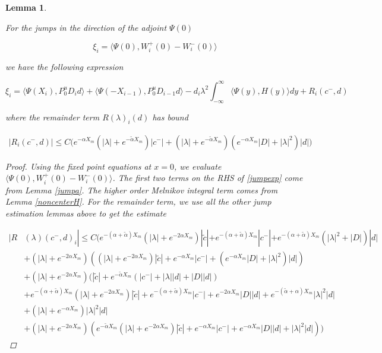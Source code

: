 \documentclass[12pt]{article}
\newtheorem{lemma}{Lemma}
\begin{document}
\begin{lemma}\label{jump}

For the jumps in the direction of the adjoint $\Psi(0)$

\[
\xi_i = \langle \Psi(0), W_i^+(0) - W_i^-(0) \rangle
\]

we have the following expression

\begin{equation}\label{jumpexp}
\xi_i = \langle \Psi(X_i), P^u_0 D_i d \rangle + \langle \Psi(-X_{i-1}), P^u_0 D_{i-1} d \rangle - d_i \lambda^2 \int_{-\infty}^\infty \langle \Psi(y), H(y) \rangle dy + R_i(c^-, d)
\end{equation}

where the remainder term $R(\lambda)_i(d)$ has bound

\begin{align}\label{remainder1}
|R_i(c^-, d)| \leq C \Big( e^{-\alpha X_m}(|\lambda| + e^{-\tilde{\alpha} X_m} )|c^-| + 
(|\lambda| + e^{-\tilde{\alpha} X_m} )( e^{-\alpha X_m} |D| + |\lambda|^2)|d| \Big)
\end{align}

\begin{proof}
Using the fixed point equations at $x = 0$, we evaluate $\langle \Psi(0), W_i^+(0) - W_i^-(0) \rangle$. The first two terms on the RHS of \eqref{jumpexp} come from Lemma \ref{jumpa}. The higher order Melnikov integral term comes from Lemma \ref{noncenterH}. For the remainder term, we use all the other jump estimation lemmas above to get the estimate

\begin{align*}
|R&(\lambda)(c^-, d)_i| \leq C \Big( e^{-(\alpha + \tilde{\alpha}) X_m} (|\lambda| + e^{-2 \alpha X_m}) |\tilde{c}| + e^{-(\alpha + \tilde{\alpha})X_m} |c^-| + e^{-(\alpha + \tilde{\alpha})X_m}(|\lambda|^2 + |D| )|d| \\
&+ (|\lambda| + e^{-2 \alpha X_m})((|\lambda| + e^{-2 \alpha X_m}) |\tilde{c}| + e^{-\alpha X_m}|c^-| + (e^{-\alpha X_m}|D|+ |\lambda|^2 )|d|) \\
&+ (|\lambda| + e^{-2 \alpha X_m})( |\tilde{c}| + e^{-\tilde{\alpha} X_m} ( |c^-| 
+ |\lambda| |d| + |D||d| ) \\
&+ e^{-(\alpha + \tilde{\alpha}) X_m} (|\lambda| + e^{-2 \alpha X_m}) |\tilde{c}| + e^{-(\alpha + \tilde{\alpha}) X_m} |c^-| + e^{-2 \alpha X_m} |D||d| + e^{-(\tilde{\alpha} + \alpha) X_m} |\lambda|^2 |d| \\
&+ (|\lambda| + e^{-\alpha X_m} ) |\lambda|^2 |d| \\
&+ (|\lambda| + e^{-2 \alpha X_m})( e^{-\tilde{\alpha} X_m } (|\lambda| + e^{-2 \alpha X_m}) |\tilde{c}| + e^{-\alpha X_m} |c^-| + e^{-\alpha X_m} |D| |d| + |\lambda|^2 |d| )
\Big)
\end{align*}


\end{proof}
\end{lemma}
\end{document}
